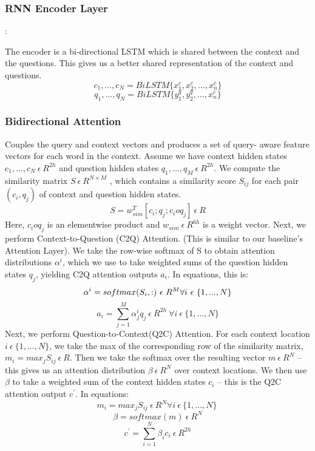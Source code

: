 \documentclass{article} %
\begin{document}
\subsubsection{RNN Encoder Layer}: 

The encoder is a bi-directional LSTM which is shared between the context and the questions. This gives us a better shared representation of the context and questions.
            $${c_1, . . . , c_N} = BiLSTM \{ x^{c}_{1} , x^{c}_{2} , . . . , x^{c}_{n}\} $$
            $${q_1, . . . , q_N} = BiLSTM \{ y^{q}_{1} , y^{q}_{2} , . . . , x^{c}_{n}\} $$

\subsubsection{Bidirectional Attention}
Couples the query and context vectors and produces a set of query- aware feature vectors for each word in the context.
Assume we have context hidden states $c_1, . . . , c_N \ \epsilon \  R^{2h} $ and question hidden states $q_1, . . . , q_M \ \epsilon \  R^{2h} $. We compute the similarity matrix $ S \ \epsilon \  R^{N\times M}$ , which contains a similarity score $S_{ij}$ for each pair $(c_i,q_j)$ of context and question hidden states.
$$S =w^{T}_{sim}[c_{i};q_{j};c_{i} o q_{j}]\ \epsilon \ R $$
Here, $c_{i} o q_{j} $ is an elementwise product and $ w_{sim} \ \epsilon \ R^{6h} $ is a weight vector.
Next, we perform Context-to-Question (C2Q) Attention. (This is similar to our baseline’s Attention Layer). We take the row-wise softmax of S to obtain attention distributions $ \alpha^i$, which we use to take weighted sums of the question hidden states $q_j$, yielding C2Q attention outputs $a_i$.
In equations, this is:
$$\alpha^i = softmax(S_i,:)\ \epsilon \ R^{M} \\     \forall i \ \epsilon \ \{1,...,N\} $$
$$a_i =  \sum_{j=1}^{M}\alpha^{i}_{j}q_j \ \epsilon \ R^{2h} \   \forall i\ \epsilon \ \{1,...,N \}$$
Next, we perform Question-to-Context(Q2C) Attention. For each context location $i\ \epsilon \ \{1,...,N \}$, we take the max of the corresponding row of the similarity matrix, $m_{i} = max_{j} S_{ij} \ \epsilon \ R$. Then we take the softmax over the resulting vector $m \ \epsilon \ R^{N} $ – this gives us an attention distribution $\beta \ \epsilon \ R^{N}$ over context locations. We then use $\beta$ to take a weighted sum of the context hidden states $c_{i}$ – this is the Q2C attention output $c^{'}$. In equations:
$$ m_{i} = max_{j}S_{ij} \ \epsilon \ R^{N} \forall i \ \epsilon \ \{1,...,N\}\ $$
$$ \beta = softmax(m)\ \epsilon \ R^N $$
$$c^{'} = \sum_{i=1}^{N}\beta_{i}c_{i} \ \epsilon \ R^{2h} $$
\end{document}
